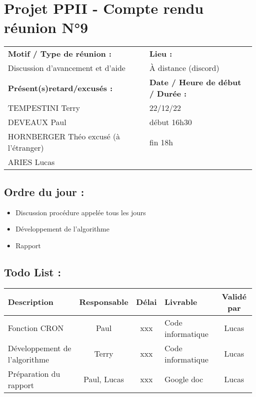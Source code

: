 \documentclass[12pt,titlepage]{report}
\begin{document}
\section*{Projet PPII - Compte rendu réunion N°9}
\begin{tabular}{|p{7cm}|p{6cm}|}
    \hline
    \textbf{Motif / Type de réunion :}
    & \textbf{Lieu :}
    \\
    Discussion d'avancement et d'aide
    & 
    À distance (discord)
    \\ \hline
    \textbf{Présent(s)retard/excusés :}
    &
    \textbf{Date / Heure de début / Durée :}
    \\ 
    TEMPESTINI Terry &  22/12/22\\  
    DEVEAUX Paul & début 16h30\\
    HORNBERGER Théo excusé (à l'étranger) & fin 18h\\
    ARIES Lucas & 
    \\ \hline
\end{tabular}

\subsection*{Ordre du jour :}
\begin{itemize}
    \item{Discussion procédure appelée tous les jours}
    \item{Développement de l'algorithme}
    \item{Rapport}
\end{itemize}

\subsection*{Todo List :}
\begin{tabular}{|p{3.5cm}|c|c|p{4.5cm}|c|}
    \hline 
    Description & Responsable & Délai & Livrable & Validé par 
    \\ \hline
    Fonction CRON & Paul & xxx & Code informatique& Lucas \\ \hline
    Développement de l'algorithme & Terry & xxx & Code informatique & Lucas \\ \hline
    Préparation du rapport & Paul, Lucas & xxx & Google doc & Lucas \\ \hline
    
\end{tabular}
\newpage
\end{document}
